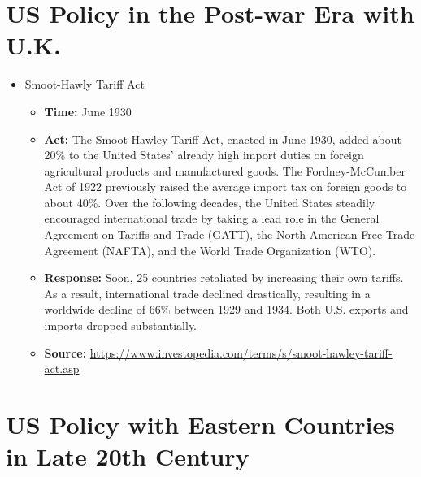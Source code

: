 \section{US Policy in the Post-war Era with U.K.}
		\begin{itemize}
		\item	Smoot-Hawly Tariff Act
			\begin{itemize}
			\item \textbf{Time: }June 1930
			\item \textbf{Act: }The Smoot-Hawley Tariff Act, enacted in June 1930, added about 20\% to the United States' already high import duties on foreign agricultural products and manufactured goods. The Fordney-McCumber Act of 1922 previously raised the average import tax on foreign goods to about 40\%.
			Over the following decades, the United States steadily encouraged international trade by taking a lead role in the General Agreement on Tariffs and Trade (GATT), the North American Free Trade Agreement (NAFTA), and the World Trade Organization (WTO).
			\item \textbf{Response: }Soon, 25 countries retaliated by increasing their own tariffs. As a result, international trade declined drastically, resulting in a worldwide decline of 66\% between 1929 and 1934. Both U.S. exports and imports dropped substantially.
			\item	\textbf{Source: }\url{https://www.investopedia.com/terms/s/smoot-hawley-tariff-act.asp}
			\end{itemize}

		\end{itemize}
		

\section{US Policy with Eastern Countries in Late 20th Century}
